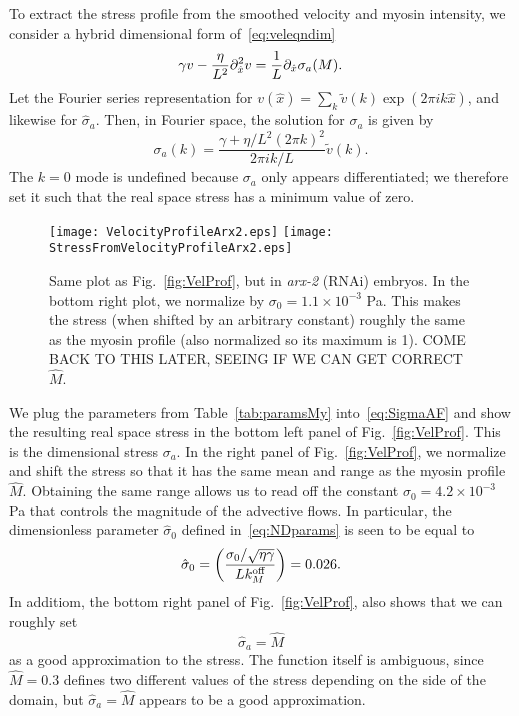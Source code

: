 \documentclass[11pt]{article}
\newcommand{\red}[1]{\color{red}#1\normalcolor}
\newcommand{\6}[1]{#1_{\text{6}}}
\newcommand{\3}[1]{#1_{\text{3}}}
\newcommand{\My}[1]{#1_M}
\begin{document}
To extract the stress profile from the smoothed velocity and myosin intensity, we consider a hybrid dimensional form of\ \eqref{eq:veleqndim}
\begin{equation*}
\gamma v -\frac{ \eta}{L^2} \partial_{\hat{x}}^2 v = \frac{1}{L} \partial_{\hat{x}}  \sigma_a(M). 
\end{equation*}
Let the Fourier series representation for $v(\hat x)= \sum_k \tilde v(k) \exp{\left(2 \pi i k \hat x \right)}$, and likewise for $\hat \sigma_a$. Then, in Fourier space, the solution for $\sigma_a$ is given by 
\begin{equation}
\label{eq:SigmaAF}
\sigma_a(k) = \frac{\gamma+ \eta/L^2 \left(2 \pi k\right)^2}{2 \pi i k/L} \tilde v(k). 
\end{equation}
The $k=0$ mode is undefined because $\sigma_a$ only appears differentiated; we therefore set it such that the real space stress has a minimum value of zero. 

\begin{figure}
\centering
\texttt{[image: VelocityProfileArx2.eps]}
\texttt{[image: StressFromVelocityProfileArx2.eps]}
\caption{\label{fig:VelProfArx2} Same plot as Fig.\ \ref{fig:VelProf}, but in \emph{arx-2} (RNAi) embryos. In the bottom right plot, we normalize by $\sigma_0=1.1 \times 10^{-3}$ Pa. This makes the stress (when shifted by an arbitrary constant) roughly the same as the myosin profile (also normalized so its maximum is 1). \red{COME BACK TO THIS LATER, SEEING IF WE CAN GET CORRECT $\hat M$.}}
\end{figure}

We plug the parameters from Table\ \ref{tab:paramsMy} into\ \eqref{eq:SigmaAF} and show the resulting real space stress in the bottom left panel of Fig.\ \ref{fig:VelProf}. This is the dimensional stress $\sigma_a$. In the right panel of Fig.\ \ref{fig:VelProf}, we normalize and shift the stress so that it has the same mean and range as the myosin profile $\hat M$. Obtaining the same range allows us to read off the constant $\sigma_0=4.2 \times 10^{-3}$ Pa that controls the magnitude of the advective flows. In particular, the dimensionless parameter $\hat{\sigma}_0$ defined in\ \eqref{eq:NDparams} is seen to be equal to
\begin{equation}
\hat{\sigma}_0 = \left(\frac{\sigma_0/ \sqrt{\eta \gamma} }{L \My{\koff}}\right)  = 0.026.
\end{equation}
In additiom, the bottom right panel of Fig.\ \ref{fig:VelProf}, also shows that we can roughly set
\begin{equation}
\hat \sigma_a=\hat M
\end{equation}
as a good approximation to the stress. The function itself is ambiguous, since $\hat M=0.3$ defines two different values of the stress depending on the side of the domain, but $\hat \sigma_a=\hat M$ appears to be a good approximation.
\end{document}
